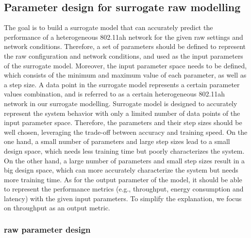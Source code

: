  
 
\subsection{Parameter design for surrogate \gls{raw} modelling \label{subsec:para_design}}


The goal is to build a surrogate model that can accurately predict the performance of a heterogeneous 802.11ah network for the given \gls{raw} settings and  network conditions. Therefore, a set of parameters should be defined to represent the \gls{raw} configuration and network conditions,  and used as the input parameters of the surrogate model. Moreover, the input parameter space needs to be defined, which consists of the minimum and maximum value of each parameter, as well as a step size. A data point in the surrogate model represents a certain parameter values combination, and is referred to as a certain heterogeneous 802.11ah network in our surrogate modelling. Surrogate model is designed to accurately represent the system behavior with only a limited number of data points of the input parameter space. Therefore, the parameters and their step sizes should be well chosen, leveraging the trade-off between accuracy and training speed. On the one hand, a small number of parameters and large step sizes lead to a small design space, which needs less training time but poorly characterizes the system. On the other hand, a large number of parameters and small step sizes result in a big design space, which can more accurately characterize the system but needs more training time. As for the output parameter of the model, it should be able to represent the performance metrics (e.g., throughput, energy consumption and latency) with the given input parameters. To simplify the explanation, we focus on throughput as an output metric.



\subsubsection{\gls{raw} parameter design \label{subsec:raw_para_design}}


